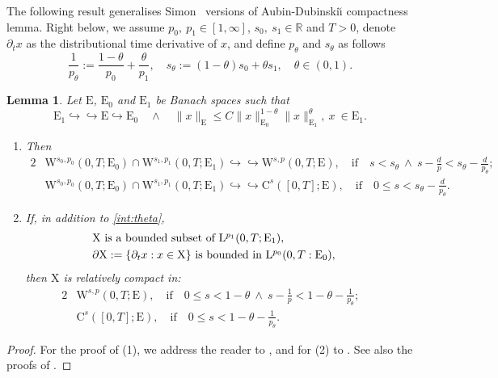 \documentclass[12pt,reqno]{amsart}
\numberwithin{equation}{section}
\newtheorem{lemma}[theorem]{Lemma}
\let\originalleft\left
\let\originalright\right
\renewcommand{\left}{\mathopen{}\mathclose\bgroup\originalleft}
\renewcommand{\right}{\aftergroup\egroup\originalright}
\theoremstyle{definition}
\def\W{\mathrm{W}}
\def\R{\mathbb{R}}
\def\E{\mathrm{E}}
\def\L{\mathrm{L}}
\def\C{\mathrm{C}}
\begin{document}
The following result generalises {Simon}~\cite[Corollaries~8 and 9]{JS} versions of Aubin-Dubinski\u{\i} compactness lemma.
Right below, we assume $p_0, \ p_1\in[1,\infty]$, $s_0,\ s_1\in\R$ and $T>0$, denote $\partial_t x$ as the distributional time derivative of $x$, and define $p_\theta$ and $s_\theta$ as follows
\begin{equation*}
\frac{1}{p_\theta}:=\frac{1-\theta}{p_0}+\frac{\theta}{p_1},\quad s_\theta:=(1-\theta)s_0+\theta s_1,\quad \theta\in(0,1).
\end{equation*}
\begin{lemma}\label{lem:Sim:Am}
Let $\E$, $\E_0$ and $\E_1$ be Banach spaces such that %
\begin{equation}\label{int:theta}
\E_1\hookrightarrow\hookrightarrow \E\hookrightarrow \E_0\quad \wedge\quad \|x\|_{\E}\leq C\|x\|_{\E_0}^{1-\theta}\|x\|_{\E_1}^\theta, \ x\ \in \E_1.
\end{equation}
\begin{enumerate}
\item Then
\begin{alignat*}{2}
& \W^{s_0,p_0}(0,T;\E_0)\cap \W^{s_1,p_1}(0,T;\E_1)\hookrightarrow\hookrightarrow \W^{s,p}(0,T;\E),
\quad\mbox{if}\quad s<s_\theta\ \wedge\ s-\frac{d}{p}<s_\theta-\frac{d}{p_\theta}; && \\
& \W^{s_0,p_0}(0,T;\E_0)\cap \W^{s_1,p_1}(0,T;\E_1)\hookrightarrow\hookrightarrow \C^s([0,T];\E),\quad\mbox{if}\quad 0\leq s<s_\theta-\frac{d}{p_\theta}.
\end{alignat*}
\item If, in addition to \eqref{int:theta},
\begin{alignat*}{2}
& \mbox{$\mathrm{X}$ is a bounded subset of $\L^{p_1}(0,T;\E_1)$}, && \\
& \mbox{$\partial \mathrm{X}:=\left\{\partial_t x: x\in \mathrm{X}\right\}$ is bounded in $\L^{p_0}(0,T:\E_0)$},
\end{alignat*}
then $\mathrm{X}$ is relatively compact in:
\begin{alignat*}{2}
& \W^{s,p}(0,T;\E),\quad\mbox{if}\quad 0\leq s<1-\theta\ \wedge\ s-\frac{1}{p}<1-\theta-\frac{1}{p_\theta}; && \\
& \C^s([0,T];\E),\quad\mbox{if}\quad 0\leq s<1-\theta-\frac{1}{p_\theta}.
\end{alignat*}
\end{enumerate}
\end{lemma}
\begin{proof}
For the proof of (1), we address the reader to \cite[Theorem~5.2]{Amann:2000}, and for (2) to \cite[Theorem~1.1]{Amann:2000}.
See also the proofs of \cite[Corollaries~8 and 9]{JS}.
\end{proof}
\end{document}
